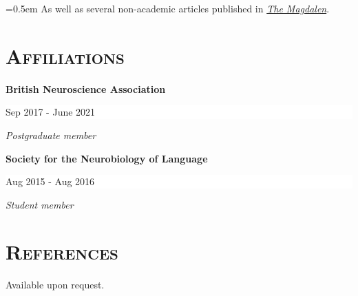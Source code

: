 \documentclass[paper=a4,fontsize=11pt]{scrartcl}
\newcommand{\sepspace}{\vspace*{1em}}
\newcommand{\NewPart}[1]{\section*{\textsc{#1}}} %
\newcommand{\ShortEntry}[3]{ %
		\noindent \textbf{#1} \hfill %
		\colorbox{White}{
            \parbox{9em}{
			\hfill\color{Black}#2}} \par %
		\noindent \textit{#3} \par} %
\begin{document}
\noindent\hangindent=0.5em \small As well as several non-academic articles published in \href{https://issuu.com/themagdalen}{\textit{The Magdalen}}.




\NewPart{Affiliations}

\ShortEntry{British Neuroscience Association}{Sep 2017 - June 2021}{Postgraduate member}
\sepspace

\ShortEntry{Society for the Neurobiology of Language}{Aug 2015 - Aug 2016}{Student member}




\NewPart{References}
Available upon request.
\end{document}
